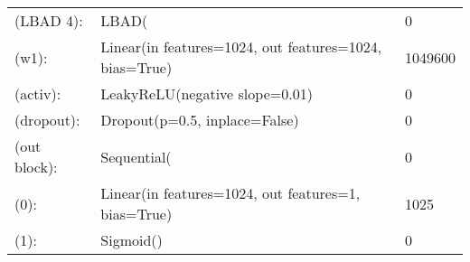 \begin{center}
\begin{tabular}{ p{}| p{}| p{}}
        (LBAD 4):            & LBAD(                                                  & 0                   \\
        (w1):                & Linear(in features=1024, out features=1024, bias=True) & 1049600             \\
        (activ):             & LeakyReLU(negative slope=0.01)                         & 0                   \\
        (dropout):           & Dropout(p=0.5, inplace=False)                          & 0                   \\

        (out block):         & Sequential(                                            & 0                   \\
        (0):                 & Linear(in features=1024, out features=1, bias=True)    & 1025                \\
        (1):                 & Sigmoid()                                              & 0                   \\
    \end{tabular}
\end{center}